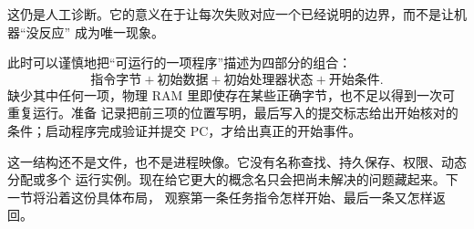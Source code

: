 这仍是人工诊断。它的意义在于让每次失败对应一个已经说明的边界，而不是让机器“没反应”
成为唯一现象。


此时可以谨慎地把“可运行的一项程序”描述为四部分的组合：
\[
\text{指令字节}+\text{初始数据}+\text{初始处理器状态}+\text{开始条件}.
\]
缺少其中任何一项，物理 RAM 里即使存在某些正确字节，也不足以得到一次可重复运行。准备
记录把前三项的位置写明，最后写入的提交标志给出开始核对的条件；启动程序完成验证并提交
PC，才给出真正的开始事件。

这一结构还不是文件，也不是进程映像。它没有名称查找、持久保存、权限、动态分配或多个
运行实例。现在给它更大的概念名只会把尚未解决的问题藏起来。下一节将沿着这份具体布局，
观察第一条任务指令怎样开始、最后一条又怎样返回。
